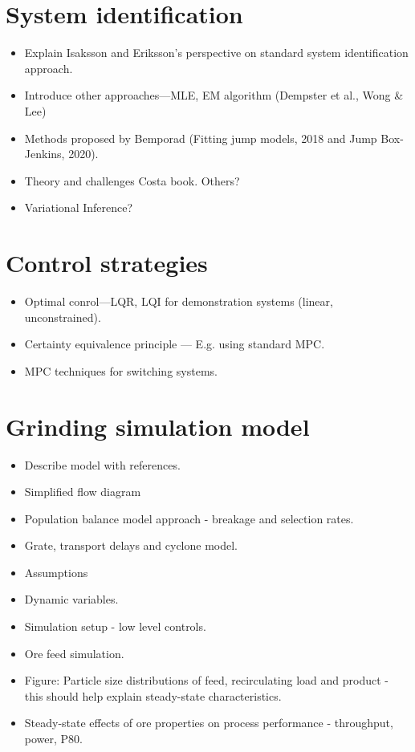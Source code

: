 \section{System identification}

\begin{itemize}
	\item Explain Isaksson and Eriksson's perspective on standard system identification approach.
	\item Introduce other approaches—MLE, EM algorithm (Dempster et al., Wong \& Lee)
	\item Methods proposed by Bemporad (Fitting jump models, 2018 and Jump Box-Jenkins, 2020).
	\item Theory and challenges Costa book. Others?
	\item Variational Inference?
\end{itemize}


\section{Control strategies}

\begin{itemize}
	\item Optimal conrol—LQR, LQI for demonstration systems (linear, unconstrained).
	\item Certainty equivalence principle — E.g. using standard MPC.
	\item MPC techniques for switching systems.
\end{itemize}

\section{Grinding simulation model}

\begin{itemize}
	\item Describe model with references.
	\item Simplified flow diagram
	\item Population balance model approach - breakage and selection rates.
	\item Grate, transport delays and cyclone model.
	\item Assumptions
	\item Dynamic variables.
	\item Simulation setup - low level controls.
	\item Ore feed simulation.
	\item Figure: Particle size distributions of feed, recirculating load and product - this should help explain steady-state characteristics.
	\item Steady-state effects of ore properties on process performance - throughput, power, P80.
\end{itemize}

